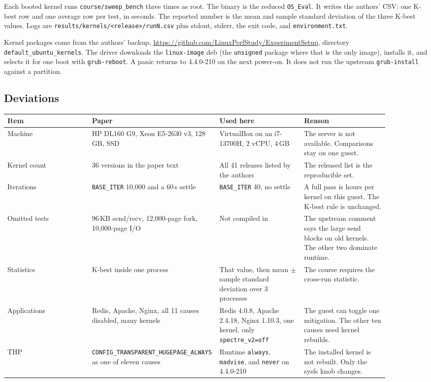 \documentclass[11pt]{article}
\begin{document}
Each booted kernel runs \texttt{course/sweep\_bench} three times as root. The binary is the reduced \texttt{OS\_Eval}. It writes the authors' CSV: one K-best row and one average row per test, in seconds. The reported number is the mean and sample standard deviation of the three K-best values. Logs are \texttt{results/kernels/<release>/runN.csv} plus stdout, stderr, the exit code, and \texttt{environment.txt}.

Kernel packages come from the authors' backup, \url{https://github.com/LinuxPerfStudy/ExperimentSetup}, directory \texttt{default\_ubuntu\_kernels}. The driver downloads the \texttt{linux-image} deb (the \texttt{unsigned} package where that is the only image), installs it, and selects it for one boot with \texttt{grub-reboot}. A panic returns to 4.4.0-210 on the next power-on. It does not run the upstream \texttt{grub-install} against a partition.

\subsection{Deviations}

\begin{center}
\small
\begin{tabular}{@{}p{0.22\linewidth}p{0.24\linewidth}p{0.22\linewidth}p{0.22\linewidth}@{}}
\toprule
Item & Paper & Used here & Reason \\
\midrule
Machine & HP DL160 G9, Xeon E5-2630 v3, 128\,GB, SSD & VirtualBox on an i7-13700H, 2 vCPU, 4\,GB & The server is not available. Comparisons stay on one guest. \\
Kernel count & 36 versions in the paper text & All 41 releases listed by the authors & The released list is the reproducible set. \\
Iterations & \texttt{BASE\_ITER} 10{,}000 and a 60\,s settle & \texttt{BASE\_ITER} 40, no settle & A full pass is hours per kernel on this guest. The K-best rule is unchanged. \\
Omitted tests & 96\,KB send/recv, 12{,}000-page fork, 10{,}000-page I/O & Not compiled in & The upstream comment says the large send blocks on old kernels. The other two dominate runtime. \\
Statistics & K-best inside one process & That value, then mean $\pm$ sample standard deviation over 3 processes & The course requires the cross-run statistic. \\
Applications & Redis, Apache, Nginx, all 11 causes disabled, many kernels & Redis 4.0.8, Apache 2.4.18, Nginx 1.10.3, one kernel, only \texttt{spectre\_v2=off} & The guest can toggle one mitigation. The other ten causes need kernel rebuilds. \\
THP & \texttt{CONFIG\_TRANSPARENT\_HUGEPAGE\_ALWAYS} as one of eleven causes & Runtime \texttt{always}, \texttt{madvise}, and \texttt{never} on 4.4.0-210 & The installed kernel is not rebuilt. Only the sysfs knob changes. \\
\bottomrule
\end{tabular}
\end{center}
\end{document}
